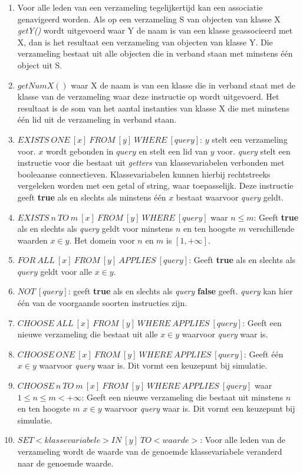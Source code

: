 \begin{enumerate}
	\item Voor alle leden van een verzameling tegelijkertijd kan een associatie genavigeerd worden. Als op een verzameling S van objecten van klasse X \textit{getY()} wordt uitgevoerd waar Y de naam is van een klasse geassocieerd met X, dan is het resultaat een verzameling van objecten van klasse Y. Die verzameling bestaat uit alle objecten die in verband staan met minstens \'e\'en object uit S.
	\item $getNumX()$ waar X de naam is van een klasse die in verband staat met de klasse van de verzameling waar deze instructie op wordt uitgevoerd. Het resultaat is de som van het aantal instanties van klasse X die met minstens \'e\'en lid uit de verzameling in verband staan.
	\item $EXISTS\ ONE\ [x]\ FROM\ [y]\ WHERE\ [query]$: $y$ stelt een verzameling voor. $x$ wordt gebonden in $query$ en stelt een lid van $y$ voor. \textit{query} stelt een instructie voor die bestaat uit \textit{getters} van klassevariabelen verbonden met booleaanse connectieven. Klassevariabelen kunnen hierbij rechtstreeks vergeleken worden met een getal of string, waar toepasselijk. Deze instructie geeft \textbf{true} als en slechts als minstens \'e\'en $x$ bestaat waarvoor \textit{query} geldt.\label{instr:exists-one}
	\item $EXISTS\ n\ TO\ m\ [x]\ FROM\ [y]\  WHERE\ [query]$ waar $n \leq m$: Geeft \textbf{true} als en slechts als \textit{query} geldt voor minstens $n$ en ten hoogste $m$ verschillende waarden $x \in y$. Het domein voor $n$ en $m$ is $[1,+\infty]$.
	\item $FOR\ ALL\ [x]\ FROM\ [y]\ APPLIES\ [query]$: Geeft \textbf{true} als en slechts als $query$ geldt voor alle $x \in y$.
	\item $NOT\ [query]$: geeft \textbf{true} als en slechts als \textit{query} \textbf{false} geeft. \textit{query} kan hier \'e\'en van de voorgaande soorten instructies zijn.
	\item $CHOOSE\ ALL\ [x]\ FROM\ [y]\ WHERE\ APPLIES\ [query]$: Geeft een nieuwe verzameling die bestaat uit alle $x \in y$ waarvoor \textit{query} waar is.
	\item $CHOOSE\ ONE\ [x]\ FROM\ [y]\ WHERE\ APPLIES\ [query]$: Geeft \'e\'en $x \in y$ waarvoor \textit{query} waar is. Dit vormt een keuzepunt bij simulatie.\label{instr:choose-one}
	\item $CHOOSE\ n\ TO\ m\ [x]\ FROM\ [y]\ WHERE\ APPLIES\ [query]$ waar $1 \leq n \leq m < +\infty$: Geeft een nieuwe verzameling die bestaat uit minstens $n$ en ten hoogste $m$ $x \in y$ waarvoor \textit{query} waar is. Dit vormt een keuzepunt bij simulatie.\label{instr:choose-n-to-m}
	\item $SET <klassevariabele> IN\ [y]\ TO <waarde>$: Voor alle leden van de verzameling wordt de waarde van de genoemde klassevariabele veranderd naar de genoemde waarde.\label{instr:set}
\end{enumerate}

